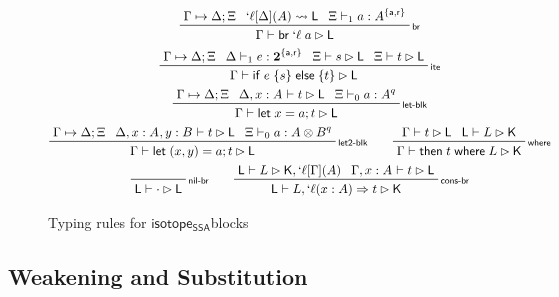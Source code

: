 \documentclass[acmsmall,screen,review]{acmart}
\newcommand{\mb}[1]{\ensuremath{\mathbf{#1}}}
\newcommand{\ms}[1]{\ensuremath{\mathsf{#1}}}
\newcommand{\lbl}[1]{{`#1}}
\newcommand{\lto}{\Rightarrow}
\newcommand{\letstmt}[3]{\ensuremath{\ms{let}\;#1 = #2; #3}}
\newcommand{\brb}[2]{\ms{br}\;#1\;#2}
\newcommand{\lbrb}[2]{\brb{\lbl{#1}}{#2}}
\newcommand{\ite}[3]{\ms{if}\;#1\;\{#2\}\;\ms{else}\;\{#3\}}
\newcommand{\ewhere}[2]{\ms{then}\;#1\;\ms{where}\;#2}
\newcommand{\wbranch}[3]{#1(#2) \lto #3}
\newcommand{\lwbranch}[3]{\wbranch{\lbl{#1}}{#2}{#3}}
\newcommand{\csplits}[3]{#1 \mapsto #2;#3}
\newcommand{\lwk}[2]{#1 \rightsquigarrow #2}
\newcommand{\thyp}[3]{#1: {#2}^{#3}}
\newcommand{\lhyp}[3]{#1[#2](#3)}
\newcommand{\llhyp}[3]{\lhyp{\lbl{#1}}{#2}{#3}}
\newcommand{\rle}[1]{{\scriptsize\textsf{#1}}}
\newcommand{\tint}{{\{\ms{a}, \ms{r}\}}}
\newcommand{\hasty}[5]{#1 \vdash_{#2} #3: {#4}^{#5}}
\newcommand{\haslb}[3]{#1 \vdash #2 \rhd #3}
\newcommand{\lhaslb}[3]{#1 \vdash #2 \rhd #3}
\newcommand{\isotopessa}{\ms{isotope_{SSA}}}
\begin{document}
\begin{figure}
  \begin{gather*}    
    \prftree[r]{\rle{br}}
      {\csplits{\Gamma}{\Delta}{\Xi}}
      {\lwk{\llhyp{\ell}{\Delta}{A}}{\ms{L}}}
      {\hasty{\Xi}{1}{a}{A}{\tint}}
      {\haslb{\Gamma}{\lbrb{\ell}{a}}{\ms{L}}} 
    \\
    \prftree[r]{\rle{ite}}
      {\csplits{\Gamma}{\Delta}{\Xi}}
      {\hasty{\Delta}{1}{e}{\mb{2}}{\tint}}
      {\haslb{\Xi}{s}{\ms{L}}}
      {\haslb{\Xi}{t}{\ms{L}}}
      {\haslb{\Gamma}{\ite{e}{s}{t}}{\ms{L}}} 
    \\
    \prftree[r]{\rle{let-blk}}
      {\csplits{\Gamma}{\Delta}{\Xi}}
      {\haslb{\Delta, \thyp{x}{A}{}}{t}{\ms{L}}}
      {\hasty{\Xi}{0}{a}{A}{q}}
      {\haslb{\Gamma}{\letstmt{x}{a}{t}}{\ms{L}}} 
    \\
    \prftree[r]{\rle{let2-blk}}
      {\csplits{\Gamma}{\Delta}{\Xi}}
      {\haslb{\Delta, \thyp{x}{A}{}, \thyp{y}{B}{}}{t}{\ms{L}}}
      {\hasty{\Xi}{0}{a}{A \otimes B}{q}}
      {\haslb{\Gamma}{\letstmt{(x, y)}{a}{t}}{\ms{L}}} \qquad
    \prftree[r]{\rle{where}}
      {\haslb{\Gamma}{t}{\ms{L}}}
      {\lhaslb{\ms{L}}{L}{\ms{K}}}
      {\haslb{\Gamma}{\ewhere{t}{L}}{\ms{K}}}
    \\
    \prftree[r]{\rle{nil-br}}
      {\lhaslb{\ms{L}}{\cdot}{\ms{L}}} \qquad
    \prftree[r]{\rle{cons-br}}
      {\lhaslb{\ms{L}}{L}{\ms{K}, \llhyp{\ell}{\Gamma}{A}}}
      {\haslb{\Gamma, \thyp{x}{A}{}}{t}{\ms{L}}}
      {\lhaslb{\ms{L}}{L, \lwbranch{\ell}{x: A}{t}}{\ms{K}}}
  \end{gather*}
  \caption{Typing rules for \isotopessa blocks}
  \label{fig:ssa-block-typing}
\end{figure}

\subsection{Weakening and Substitution}
\end{document}
